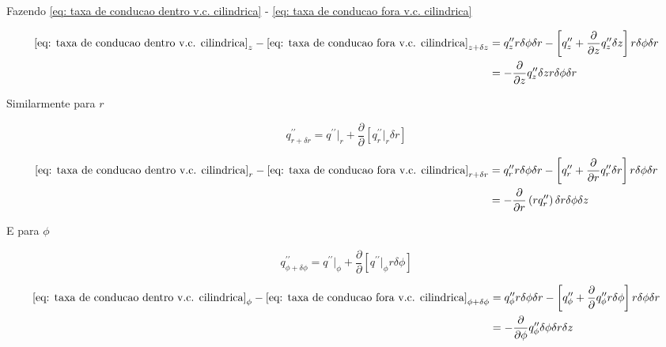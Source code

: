 Fazendo \eqref{eq: taxa de conducao dentro v.c. cilindrica} - \eqref{eq: taxa de conducao fora v.c. cilindrica}

\begin{align}
    \eqref{eq: taxa de conducao dentro v.c. cilindrica}_z - \eqref{eq: taxa de conducao fora v.c. cilindrica}_{z+ \delta z}  &= q^{\prime \prime}_z r \delta \phi \delta r - \left[ q^{\prime \prime}_z + \frac{\partial}{\partial z}q^{\prime \prime}_z \delta z \right] r \delta \phi \delta r\\
    &= - \frac{\partial}{\partial z}q^{\prime \prime}_z \delta z r \delta \phi \delta r
\end{align}

Similarmente para \(r\)

\begin{equation}
    q^{\prime \prime}_{r+\delta r}=q^{\prime \prime}|_r + \frac{\partial}{\partial}[q^{\prime \prime}_r|_r \delta r]
\end{equation}

\begin{align}
    \eqref{eq: taxa de conducao dentro v.c. cilindrica}_r - \eqref{eq: taxa de conducao fora v.c. cilindrica}_{r+ \delta r} &= q^{\prime \prime}_r r \delta \phi \delta r - \left[ q^{\prime \prime}_r + \frac{\partial}{\partial r}q^{\prime \prime}_r \delta r \right] r \delta \phi \delta r\\
    &= - \frac{\partial}{\partial r}\left( r q^{\prime \prime}_r \right)  \delta r \delta \phi \delta z
\end{align}

E para \(\phi \) 

\begin{equation}
    q^{\prime \prime}_{\phi+\delta \phi}=q^{\prime \prime}|_\phi + \frac{\partial}{\partial}[q^{\prime \prime}|_\phi  r \delta \phi]
\end{equation}

\begin{align}
    \eqref{eq: taxa de conducao dentro v.c. cilindrica}_{\phi }  - \eqref{eq: taxa de conducao fora v.c. cilindrica}_{\phi + \delta \phi }  &= q^{\prime \prime}_\phi r \delta \phi \delta r - \left[ q^{\prime \prime}_\phi + \frac{\partial}{\partial}q^{\prime \prime}_\phi r \delta \phi \right] r \delta \phi \delta r\\
    &= - \frac{\partial}{\partial \phi }q^{\prime \prime}_\phi  \delta \phi \delta r  \delta z
\end{align}

